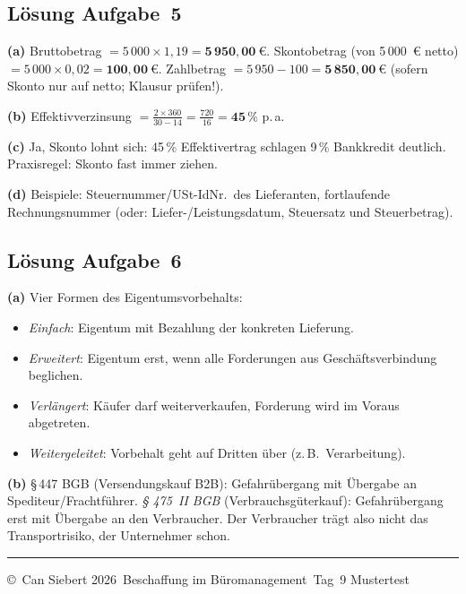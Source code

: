 \documentclass[11pt, a4paper]{article}
\begin{document}
\subsection*{Lösung Aufgabe~5}

\begin{loesung}
\textbf{(a)} Bruttobetrag $= 5\,000 \times 1{,}19 = \mathbf{5\,950{,}00~€}$.
Skontobetrag (von 5\,000~€ netto) $= 5\,000 \times 0{,}02 = \mathbf{100{,}00~€}$.
Zahlbetrag $= 5\,950 - 100 = \mathbf{5\,850{,}00~€}$ (sofern Skonto nur auf netto;
Klausur prüfen!).

\textbf{(b)} Effektivverzinsung $= \frac{2 \times 360}{30 - 14} = \frac{720}{16} = \mathbf{45\,\%}$ p.\,a.

\textbf{(c)} Ja, Skonto lohnt sich: 45\,\% Effektivertrag schlagen 9\,\% Bankkredit
deutlich. Praxisregel: Skonto fast immer ziehen.

\textbf{(d)} Beispiele: Steuernummer/USt-IdNr.\ des Lieferanten, fortlaufende
Rechnungsnummer (oder: Liefer-/Leistungsdatum, Steuersatz und Steuerbetrag).
\end{loesung}

\subsection*{Lösung Aufgabe~6}

\begin{loesung}
\textbf{(a)} Vier Formen des Eigentumsvorbehalts:
\begin{itemize}[itemsep=0pt]
  \item \emph{Einfach}: Eigentum mit Bezahlung der konkreten Lieferung.
  \item \emph{Erweitert}: Eigentum erst, wenn alle Forderungen aus Geschäftsverbindung beglichen.
  \item \emph{Verlängert}: Käufer darf weiterverkaufen, Forderung wird im Voraus abgetreten.
  \item \emph{Weitergeleitet}: Vorbehalt geht auf Dritten über (z.\,B.\ Verarbeitung).
\end{itemize}

\textbf{(b)} §\,447 BGB (Versendungskauf B2B): Gefahrübergang mit Übergabe an
Spediteur/Frachtführer. \emph{§ 475~II BGB} (Verbrauchsgüterkauf): Gefahrübergang
erst mit Übergabe an den Verbraucher. Der Verbraucher trägt also nicht das
Transportrisiko, der Unternehmer schon.
\end{loesung}

\vfill
\hrule
\vspace{0.5em}
\noindent\small\color{bfwInkSoft}\copyright\ Can Siebert\,\textperiodcentered\,2026\,\textperiodcentered{} Beschaffung im Büromanagement\,\textperiodcentered{} Tag~9 Mustertest
\end{document}
